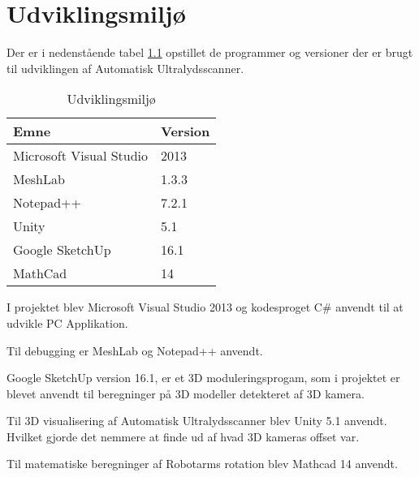 \chapter{Udviklingsmiljø}\label{Udvikling}
Der er i nedenstående tabel \ref{Udvikling} opstillet de programmer og versioner der er brugt til udviklingen af Automatisk Ultralydsscanner. 

\begin{table}[htb]
\centering
\begin{tabular}{| l | p{}| }
\hline
\textbf{Emne} & \textbf{Version} \\\hline
Microsoft Visual Studio & 2013 \\\hline
MeshLab & 1.3.3 \\\hline
Notepad++ & 7.2.1 \\\hline
Unity & 5.1 \\\hline
Google SketchUp & 16.1 \\\hline
MathCad & 14 \\\hline
\end{tabular}
\caption{Udviklingsmiljø}
\label{Udvikling}
\end{table}

I projektet blev Microsoft Visual Studio 2013 og kodesproget C\# anvendt til at udvikle PC Applikation. 
 
Til debugging er MeshLab og Notepad++ anvendt. 

Google SketchUp version 16.1, er et 3D moduleringsprogam, som i projektet er blevet anvendt til beregninger på 3D modeller detekteret af 3D kamera. 

Til 3D visualisering af Automatisk Ultralydsscanner blev Unity 5.1 anvendt. Hvilket gjorde det nemmere at finde ud af hvad 3D kameras offset var. 

Til matematiske beregninger af Robotarms rotation blev Mathcad 14 anvendt.

